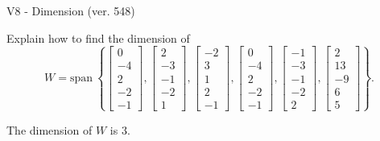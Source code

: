 \begin{exercise}
  \begin{exerciseTitle}V8 - Dimension (ver. 548)\end{exerciseTitle}
  \begin{exerciseStatement}
    Explain how to find the dimension of 
\[W=\mathrm{span}\ \left\{\left[\begin{array}{r}
0 \\
-4 \\
2 \\
-2 \\
-1
\end{array}\right] , \left[\begin{array}{r}
2 \\
-3 \\
-1 \\
-2 \\
1
\end{array}\right] , \left[\begin{array}{r}
-2 \\
3 \\
1 \\
2 \\
-1
\end{array}\right] , \left[\begin{array}{r}
0 \\
-4 \\
2 \\
-2 \\
-1
\end{array}\right] , \left[\begin{array}{r}
-1 \\
-3 \\
-1 \\
-2 \\
2
\end{array}\right] , \left[\begin{array}{r}
2 \\
13 \\
-9 \\
6 \\
5
\end{array}\right]\right\}.\]



  \end{exerciseStatement}
  \begin{exerciseAnswer}
   The dimension of \(W\) is  \(3\).
  


  \end{exerciseAnswer}
\end{exercise}